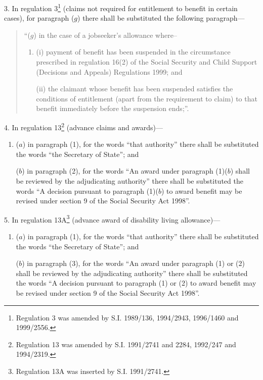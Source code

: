 \documentclass[12pt,a4paper]{article}
\begin{document}
3.  In regulation 3\footnote{\frenchspacing Regulation 3 was amended by S.I. 1989/136, 1994/2943, 1996/1460 and 1999/2556.} (claims not required for entitlement to benefit in certain cases), for paragraph ($g$)  there shall be substituted the following paragraph---
\begin{quotation}
“($g$) in the case of a jobseeker’s allowance where–
\begin{enumerate}\item[]
(i) payment of benefit has been suspended in the circumstance prescribed in regulation 16(2) of the Social Security and Child Support (Decisions and Appeals) Regulations 1999; and

(ii) the claimant whose benefit has been suspended satisfies the conditions of entitlement (apart from the requirement to claim) to that benefit immediately before the suspension ends;”.
\end{enumerate}
\end{quotation}

\medskip

4.  In regulation 13\footnote{\frenchspacing Regulation 13 was amended by S.I. 1991/2741 and 2284, 1992/247 and 1994/2319.} (advance claims and awards)---
\begin{enumerate}\item[]
($a$) in paragraph (1), for the words “that authority” there shall be substituted the words “the Secretary of State”; and

($b$) in paragraph (2), for the words “An award under paragraph (1)($b$)  shall be reviewed by the adjudicating authority” there shall be substituted the words “A decision pursuant to paragraph (1)($b$)  to award benefit may be revised under section 9 of the Social Security Act 1998”.
\end{enumerate}

\medskip

5.  In regulation 13A\footnote{\frenchspacing Regulation 13A was inserted by S.I. 1991/2741.} (advance award of disability living allowance)---
\begin{enumerate}\item[]
($a$) in paragraph (1), for the words “that authority” there shall be substituted the words “the Secretary of State”; and

($b$) in paragraph (3), for the words “An award under paragraph (1) or (2) shall be reviewed by the adjudicating authority” there shall be substituted the words “A decision pursuant to paragraph (1) or (2) to award benefit may be revised under section 9 of the Social Security Act 1998”.
\end{enumerate}
\end{document}
